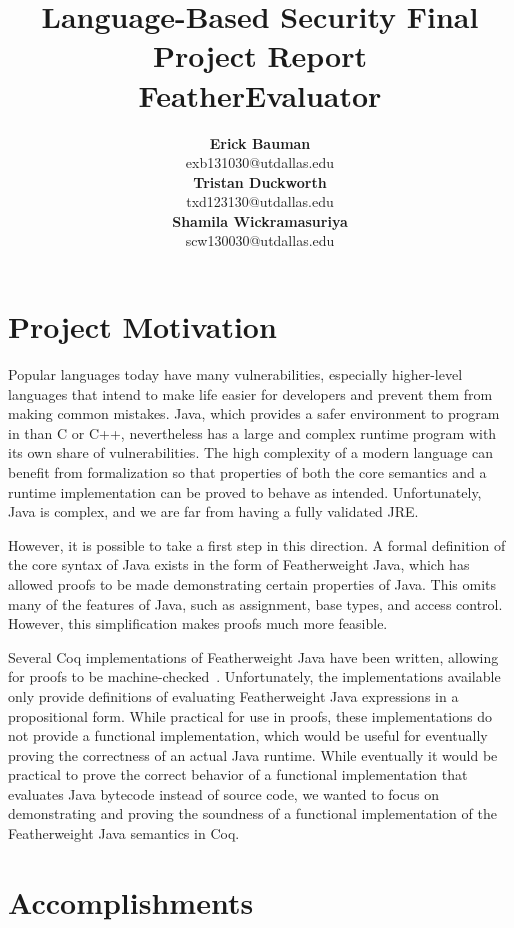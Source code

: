 \documentclass{article}
\author{\textbf{Erick Bauman} \\ exb131030@utdallas.edu \\\textbf{Tristan Duckworth} \\ txd123130@utdallas.edu \\\textbf{Shamila Wickramasuriya} \\ scw130030@utdallas.edu}
\title{\huge{Language-Based Security Final Project Report} \\ \LARGE{FeatherEvaluator}}
\begin{document}
\maketitle

\section{Project Motivation}

Popular languages today have many vulnerabilities, especially higher-level languages that intend to make life easier for developers and prevent them from making common mistakes.  Java, which provides a safer environment to program in than C or C++, nevertheless has a large and complex runtime program with its own share of vulnerabilities.  The high complexity of a modern language can benefit from formalization so that properties of both the core semantics and a runtime implementation can be proved to behave as intended.  Unfortunately, Java is complex, and we are far from having a fully validated JRE.

However, it is possible to take a first step in this direction.  A formal definition of the core syntax of Java exists in the form of Featherweight Java\cite{igarashi2001featherweight}, which has allowed proofs to be made demonstrating certain properties of Java.  This omits many of the features of Java, such as assignment, base types, and access control.  However, this simplification makes proofs much more feasible.

Several Coq implementations of Featherweight Java have been written, allowing for proofs to be machine-checked~\cite{mackay2012encoding, delaware2011product,castfree}.  Unfortunately, the implementations available only provide definitions of evaluating Featherweight Java expressions in a propositional form.  While practical for use in proofs, these implementations do not provide a functional implementation, which would be useful for eventually proving the correctness of an actual Java runtime.  While eventually it would be practical to prove the correct behavior of a functional implementation that evaluates Java bytecode instead of source code, we wanted to focus on demonstrating and proving the soundness of a functional implementation of the Featherweight Java semantics in Coq.

\section{Accomplishments}
\end{document}
